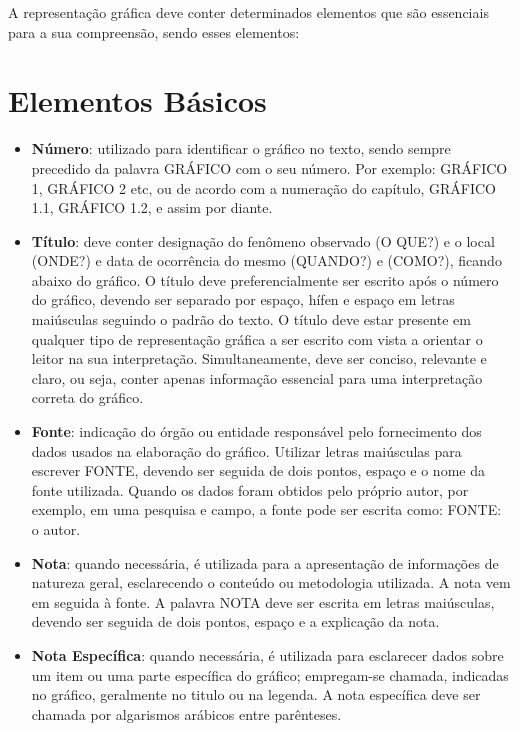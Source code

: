 \inic A representação gráfica deve conter determinados elementos que são essenciais para a sua compreensão, sendo esses elementos:



\newpage
\section{Elementos Básicos}

\begin{itemize}
\item \textbf{Número}: utilizado para identificar o gráfico no
texto, sendo sempre precedido da palavra GRÁFICO com o seu número.
Por exemplo: GRÁFICO 1, GRÁFICO 2 etc, ou de acordo com a
numeração do capítulo, GRÁFICO 1.1, GRÁFICO 1.2, e assim por
diante. \item \textbf{Título}: deve conter designação do fenômeno
observado (O QUE?) e o local (ONDE?) e data de ocorrência do mesmo
(QUANDO?) e (COMO?), ficando abaixo do gráfico. O título deve
preferencialmente ser escrito após o número do gráfico, devendo
ser separado por espaço, hífen e espaço em letras maiúsculas
seguindo o padrão do texto. O título deve estar presente em qualquer tipo de representação gráfica a ser escrito com vista a orientar o leitor na sua interpretação. Simultaneamente, deve ser conciso, relevante e claro, ou seja, conter apenas informação essencial para uma interpretação correta do gráfico. 
\item \textbf{Fonte}: indicação do
órgão ou entidade responsável pelo fornecimento dos dados usados
na elaboração do gráfico. Utilizar letras maiúsculas para escrever
FONTE, devendo ser seguida de dois pontos, espaço e o nome da
fonte utilizada. Quando os dados foram obtidos pelo próprio autor,
por exemplo, em uma pesquisa e campo, a fonte pode ser escrita
como: FONTE: o autor. \item \textbf{Nota}: quando necessária, é
utilizada para a apresentação de informações de natureza geral,
esclarecendo o conteúdo ou metodologia utilizada. A nota vem em
seguida à fonte. A palavra NOTA deve ser escrita em letras
maiúsculas, devendo ser seguida de dois pontos, espaço e a
explicação da nota. \item \textbf{Nota Específica}: quando
necessária, é utilizada para esclarecer dados sobre um item ou uma
parte específica do gráfico; empregam-se chamada, indicadas no
gráfico, geralmente no titulo ou na legenda. A nota específica
deve ser chamada por algarismos arábicos entre parênteses.

\end{itemize}
